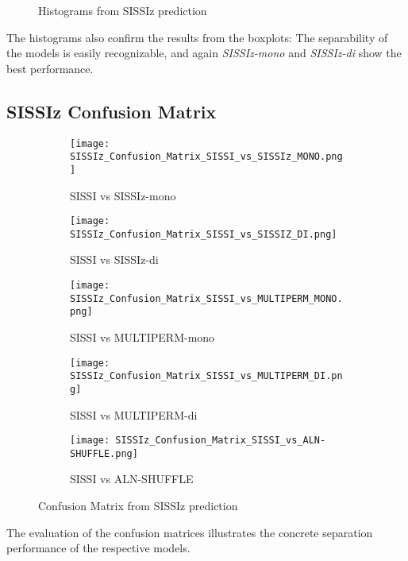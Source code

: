 \documentclass{article}
\begin{document}
\begin{large}
\begin{large}
\begin{large}
\begin{figure}[H]
    \caption{Histograms from SISSIz prediction}
\end{figure}

The histograms also confirm the results from the boxplots: The separability of the models is easily recognizable, and again \textit{SISSIz-mono} and \textit{SISSIz-di} show the best performance. \vspace{1em}

\subsection{SISSIz Confusion Matrix}

\begin{figure}[H]
    \centering
    \begin{subfigure}[b]{0.48\textwidth}
        \texttt{[image: SISSIz\_Confusion\_Matrix\_SISSI\_vs\_SISSIz\_MONO.png]}
        \caption{SISSI vs SISSIz-mono}
    \end{subfigure}
    \hfill
    \begin{subfigure}[b]{0.48\textwidth}
        \texttt{[image: SISSIz\_Confusion\_Matrix\_SISSI\_vs\_SISSIZ\_DI.png]}
        \caption{SISSI vs SISSIz-di}
    \end{subfigure}
    \vspace{1em}
    
    \begin{subfigure}[b]{0.48\textwidth}
        \texttt{[image: SISSIz\_Confusion\_Matrix\_SISSI\_vs\_MULTIPERM\_MONO.png]}
        \caption{SISSI vs MULTIPERM-mono}
    \end{subfigure}
    \hfill
    \begin{subfigure}[b]{0.48\textwidth}
        \texttt{[image: SISSIz\_Confusion\_Matrix\_SISSI\_vs\_MULTIPERM\_DI.png]}
        \caption{SISSI vs MULTIPERM-di}
    \end{subfigure}
    \vspace{1em}
    
    \begin{subfigure}[b]{0.48\textwidth}
        \texttt{[image: SISSIz\_Confusion\_Matrix\_SISSI\_vs\_ALN-SHUFFLE.png]}
        \caption{SISSI vs ALN-SHUFFLE}
    \end{subfigure}

    \caption{Confusion Matrix from SISSIz prediction}
\end{figure}

The evaluation of the confusion matrices illustrates the concrete separation performance of the respective models.\vspace{1em}


\end{large}
\end{large}
\end{large}
\end{document}
